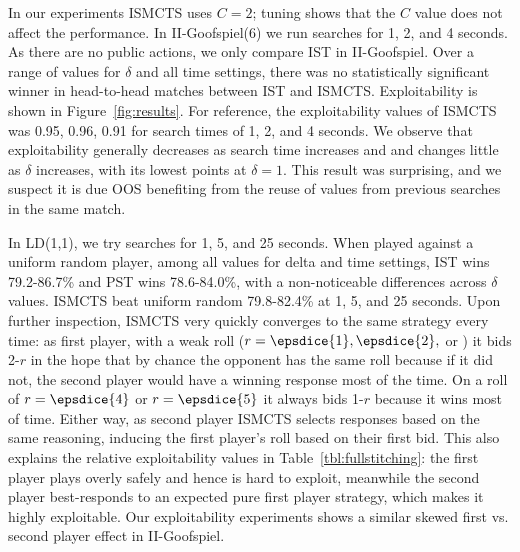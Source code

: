 \documentclass[letterpaper]{article}
\begin{document}
In our experiments ISMCTS uses $C = 2$; tuning shows that the $C$ value does not 
affect the performance. 
In II-Goofspiel(6) we run searches for 1, 2, and 4 seconds.
As there are no public actions, we only compare IST in II-Goofspiel. 
Over a range of values for $\delta$ and all time settings, there was no statistically significant
winner in head-to-head matches between IST and ISMCTS. 
Exploitability is shown in Figure~\ref{fig:results}. 
For reference, the exploitability values of ISMCTS was 0.95, 0.96, 0.91 for search times of 
1, 2, and 4 seconds. We observe that exploitability generally 
decreases as search time increases and and changes little as $\delta$ increases, with its 
lowest points at $\delta = 1$. 
This result was surprising, and we suspect it is due OOS benefiting from the reuse of 
values from previous searches in the same match. 

In LD(1,1), we try searches for 1, 5, and 25 seconds. 
When played against a uniform random player, among all values for delta and time settings, 
IST wins 79.2-86.7\% and PST wins 78.6-84.0\%, with a non-noticeable differences across $\delta$ values. 
ISMCTS beat uniform random 79.8-82.4\% at 1, 5, and 25 seconds. 
Upon further inspection, ISMCTS very quickly converges to the same strategy every time: as first player, 
with a weak roll ($r = \epsdice{1}, \epsdice{2},$ or ) it bids 2-$r$ in the hope that by chance the
opponent has the same roll because if it did not, the second player would have a winning response most of the time.
On a roll of $r = \epsdice{4}$ or $r = \epsdice{5}$ it always bids 1-$r$ because it wins most of time. Either way, as 
second player ISMCTS selects responses based on the same reasoning, inducing the first player's roll based on their
first bid. This also explains the relative exploitability values in Table~\ref{tbl:fullstitching}: the first player
plays overly safely and hence is hard to exploit, meanwhile the second player best-responds to an expected pure first 
player strategy, which makes it highly exploitable. 
Our exploitability experiments shows a similar skewed first vs. second player effect in II-Goofspiel. 
\end{document}
